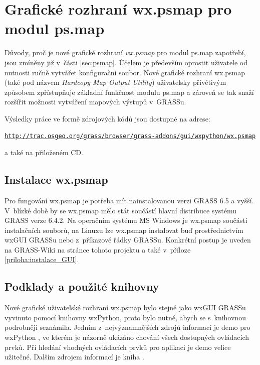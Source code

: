 \documentclass[a4paper,12pt,draft]{article}
\begin{document}
\section[Grafické rozhraní pro modul ps.map]{Grafické rozhraní
 wx.psmap pro modul ps.map}
\label{sec:gui}

Důvody, proč je nové grafické rozhraní \emph{wx.psmap} pro
modul ps.map zapotřebí, jsou zmíněny již v~části
\ref{sec:psmap}. Účelem je především oprostit uživatele od nutnosti
ručně vytvářet konfigurační soubor. Nové grafické rozhraní wx.psmap (také
pod názvem \emph{Hardcopy Map Output Utility}) uživatelsky
přívětivým způsobem zpřístupňuje zá\-kladní funkčnost modulu
ps.map a zároveň se tak snaží rozšířit možnosti vytváření
mapových výstupů v~GRASSu.

Výsledky práce ve formě zdrojových kódů jsou dostupné na adrese:

\begin{alltt}\small
\url{http://trac.osgeo.org/grass/browser/grass-addons/gui/wxpython/wx.psmap}
\end{alltt}


a také na přiloženém CD.

\subsection{Instalace wx.psmap}
Pro fungování wx.psmap je potřeba mít nainstalovanou verzi
GRASS 6.5 a vyšší. V~blízké době by se wx.psmap mělo stát součástí hlavní
distribuce systému GRASS verze 6.4.2. Na operačním systému MS Windows je
wx.psmap součástí instalačních souborů, na Linuxu lze wx.psmap instalovat buď
prostřednictvím wxGUI GRASSu nebo z~příkazové řádky GRASSu. Konkrétní
postup je uveden na GRASS-Wiki na stránce tohoto projektu
 \cite{wiki_wxpsmap} a také v~příloze \ref{priloha:instalace_GUI}.

\subsection{Podklady a použité knihovny}
Nové grafické uživatelské rozhraní wx.psmap bylo stejně jako wxGUI
GRASSu vyvinuto pomocí knihovny wxPython,
proto bylo nutné, abych se s~knihovnou podrobněji seznámila. Jedním
z~nejvýznamnějších zdrojů informací je demo pro wxPython \cite{demo},
ve kterém je názorně ukázáno chování všech dostupných ovládacích
prvků. Při hledání vhodných ovládacích prvků pro aplikaci je demo velice
užitečné.
Dalším zdrojem informací je kniha \cite{wxPythonInAction}.
\end{document}
